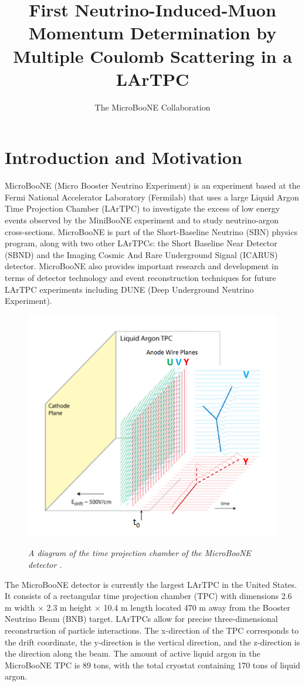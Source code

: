 \documentclass[a4paper,11pt]{article}
\author{The MicroBooNE Collaboration}
\title{First Neutrino-Induced-Muon Momentum Determination by Multiple Coulomb Scattering in a LArTPC}
\begin{document}
\maketitle
\flushbottom

\section{Introduction and Motivation}\label{sec:intro}

MicroBooNE (Micro Booster Neutrino Experiment) is an experiment based at the Fermi National Accelerator Laboratory (Fermilab) that uses a large Liquid Argon Time Projection Chamber (LArTPC) to investigate the excess of low energy events observed by the MiniBooNE experiment \cite{Aguilar-Arevalo:2013pmq} and to study neutrino-argon cross-sections. MicroBooNE is part of the Short-Baseline Neutrino (SBN) physics program, along with two other LArTPCs: the Short Baseline Near Detector (SBND) and the Imaging Cosmic And Rare Underground Signal (ICARUS) detector. MicroBooNE also provides important research and development in terms of detector technology and event reconstruction techniques for future LArTPC experiments including DUNE (Deep Underground Neutrino Experiment).\\

\begin{figure}[ht!]
\centering
	\includegraphics[width=0.4\linewidth]{Figures/static_figs/detector2.png} \\
\caption{\textit{A diagram of the time projection chamber of the MicroBooNE detector \cite{lartpc}.}}\label{detector_fig}
\end{figure}

The MicroBooNE detector is currently the largest LArTPC in the United States. It consists of a rectangular time projection chamber (TPC) with dimensions 2.6 m width $\times$ 2.3 m height $\times$ 10.4 m length located 470 m away from the Booster Neutrino Beam (BNB) target. LArTPCs allow for precise three-dimensional reconstruction of particle interactions. The x-direction of the TPC corresponds to the drift coordinate, the y-direction is the vertical direction, and the z-direction is the direction along the beam. The amount of active liquid argon in the MicroBooNE TPC is 89 tons, with the total cryostat containing 170 tons of liquid argon.\\
\end{document}
